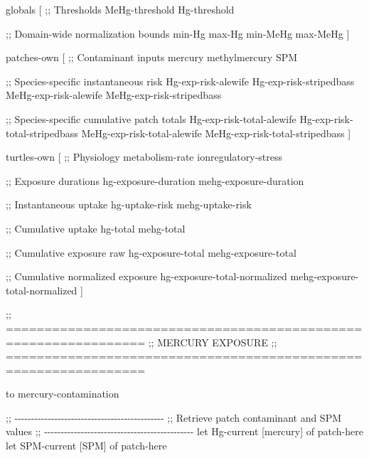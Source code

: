 \documentclass[
]{book}
\newenvironment{Shaded}{\begin{snugshade}}{\end{snugshade}}
\newcommand{\NormalTok}[1]{#1}
\begin{document}
\begin{Shaded}
\begin{Highlighting}[]

\NormalTok{globals [}
\NormalTok{  ;; Thresholds}
\NormalTok{  MeHg{-}threshold}
\NormalTok{  Hg{-}threshold}
  
\NormalTok{  ;; Domain{-}wide normalization bounds}
\NormalTok{  min{-}Hg}
\NormalTok{  max{-}Hg}
\NormalTok{  min{-}MeHg}
\NormalTok{  max{-}MeHg}
\NormalTok{]}

\NormalTok{patches{-}own [}
\NormalTok{  ;; Contaminant inputs}
\NormalTok{  mercury}
\NormalTok{  methylmercury}
\NormalTok{  SPM}

\NormalTok{  ;; Species{-}specific instantaneous risk}
\NormalTok{  Hg{-}exp{-}risk{-}alewife}
\NormalTok{  Hg{-}exp{-}risk{-}stripedbass}
\NormalTok{  MeHg{-}exp{-}risk{-}alewife}
\NormalTok{  MeHg{-}exp{-}risk{-}stripedbass}

\NormalTok{  ;; Species{-}specific cumulative patch totals}
\NormalTok{  Hg{-}exp{-}risk{-}total{-}alewife}
\NormalTok{  Hg{-}exp{-}risk{-}total{-}stripedbass}
\NormalTok{  MeHg{-}exp{-}risk{-}total{-}alewife}
\NormalTok{  MeHg{-}exp{-}risk{-}total{-}stripedbass}
\NormalTok{]}

\NormalTok{turtles{-}own [}
\NormalTok{  ;; Physiology}
\NormalTok{  metabolism{-}rate}
\NormalTok{  ionregulatory{-}stress}

\NormalTok{  ;; Exposure durations}
\NormalTok{  hg{-}exposure{-}duration}
\NormalTok{  mehg{-}exposure{-}duration}

\NormalTok{  ;; Instantaneous uptake}
\NormalTok{  hg{-}uptake{-}risk}
\NormalTok{  mehg{-}uptake{-}risk}

\NormalTok{  ;; Cumulative uptake}
\NormalTok{  hg{-}total}
\NormalTok{  mehg{-}total}

\NormalTok{  ;; Cumulative exposure raw}
\NormalTok{  hg{-}exposure{-}total}
\NormalTok{  mehg{-}exposure{-}total}

\NormalTok{  ;; Cumulative normalized exposure}
\NormalTok{  hg{-}exposure{-}total{-}normalized}
\NormalTok{  mehg{-}exposure{-}total{-}normalized}
\NormalTok{]}

\NormalTok{;; ================================================================}
\NormalTok{;; MERCURY EXPOSURE}
\NormalTok{;; ================================================================}

\NormalTok{to mercury{-}contamination}
  
\NormalTok{  ;; {-}{-}{-}{-}{-}{-}{-}{-}{-}{-}{-}{-}{-}{-}{-}{-}{-}{-}{-}{-}{-}{-}{-}{-}{-}{-}{-}{-}{-}{-}{-}{-}{-}{-}{-}{-}{-}{-}{-}{-}{-}{-}{-}{-}{-}}
\NormalTok{  ;; Retrieve patch contaminant and SPM values}
\NormalTok{  ;; {-}{-}{-}{-}{-}{-}{-}{-}{-}{-}{-}{-}{-}{-}{-}{-}{-}{-}{-}{-}{-}{-}{-}{-}{-}{-}{-}{-}{-}{-}{-}{-}{-}{-}{-}{-}{-}{-}{-}{-}{-}{-}{-}{-}{-}}
\NormalTok{  let Hg{-}current [mercury] of patch{-}here}
\NormalTok{  let SPM{-}current [SPM] of patch{-}here}
  

\end{Highlighting}
\end{Shaded}
\end{document}

